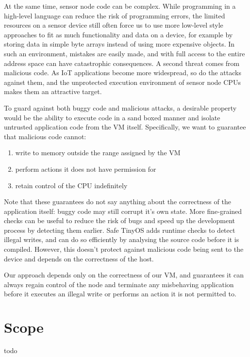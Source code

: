 At the same time, sensor node code can be complex. While programming in a high-level language can reduce the risk of programming errors, the limited resources on a sensor device still often force us to use more low-level style approaches to fit as much functionality and data on a device, for example by storing data in simple byte arrays instead of using more expensive objects. In such an environment, mistakes are easily made, and with full access to the entire address space can have catastrophic consequences. A second threat comes from malicious code. As IoT applications become more widespread, so do the attacks against them, and the unprotected execution environment of sensor node CPUs makes them an attractive target.

To guard against both buggy code and malicious attacks, a desirable property would be the ability to execute code in a sand boxed manner and isolate untrusted application code from the VM itself. Specifically, we want to guarantee that malicious code cannot:
\begin{enumerate}
	\item write to memory outside the range assigned by the VM
	\item perform actions it does not have permission for
	\item retain control of the CPU indefinitely
\end{enumerate}

Note that these guarantees do not say anything about the correctness of the application itself: buggy code may still corrupt it's own state. More fine-grained checks can be useful to reduce the risk of bugs and speed up the development process by detecting them earlier. Safe TinyOS \cite{Cooprider:2007ub} adds runtime checks to detect illegal writes, and can do so efficiently by analysing the source code before it is compiled. However, this doesn't protect against malicious code being sent to the device and depends on the correctness of the host.

Our approach depends only on the correctness of our VM, and guarantees it can always regain control of the node and terminate any misbehaving application before it executes an illegal write or performs an action it is not permitted to.


\section{Scope}
todo

